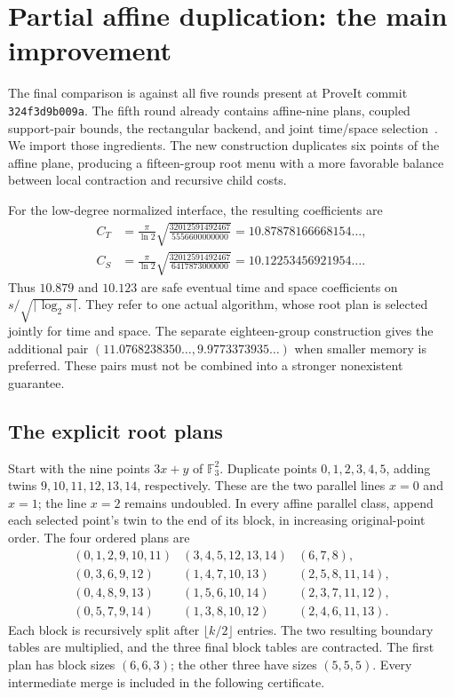 \section{Partial affine duplication: the main improvement}
\label{sec:partial15}

The final comparison is against all five rounds present at ProveIt commit
\texttt{324f3d9b009a}. The fifth round already
contains affine-nine plans, coupled support-pair bounds, the rectangular
backend, and joint time/space selection~\cite{pairwise,affinejoint,affinegeometry,affinecauchy,affineplane}. We import those ingredients.
The new construction duplicates six points of the affine plane, producing
a fifteen-group root menu with a more favorable balance between local
contraction and recursive child costs.

For the low-degree normalized interface, the resulting coefficients are
\begin{align*}
 C_T&=\frac\pi{\ln2}
 \sqrt{\frac{32012591492467}{5556600000000}}
 =10.87878166668154\ldots,\\
 C_S&=\frac\pi{\ln2}
 \sqrt{\frac{32012591492467}{6417873000000}}
 =10.12253456921954\ldots.
\end{align*}
Thus $10.879$ and $10.123$ are safe eventual time and space coefficients
on $s/\sqrt{\lceil\log_2s\rceil}$. They refer to one actual algorithm,
whose root plan is selected jointly for time and space. The separate
eighteen-group construction gives the additional pair
$(11.0768238350\ldots,9.9773373935\ldots)$ when smaller memory is preferred.
These pairs must not be combined into a stronger nonexistent guarantee.

\subsection{The explicit root plans}

Start with the nine points $3x+y$ of $\mathbb F_3^2$. Duplicate points
$0,1,2,3,4,5$, adding twins $9,10,11,12,13,14$, respectively. These are
the two parallel lines $x=0$ and $x=1$; the line $x=2$ remains undoubled.
In every affine parallel class, append each selected point's twin to the
end of its block, in increasing original-point order. The four ordered
plans are
\[
\begin{array}{lll}
(0,1,2,9,10,11)&(3,4,5,12,13,14)&(6,7,8),\\
(0,3,6,9,12)&(1,4,7,10,13)&(2,5,8,11,14),\\
(0,4,8,9,13)&(1,5,6,10,14)&(2,3,7,11,12),\\
(0,5,7,9,14)&(1,3,8,10,12)&(2,4,6,11,13).
\end{array}
\]
Each block is recursively split after $\lfloor k/2\rfloor$ entries.
The two resulting boundary tables are multiplied, and the three final
block tables are contracted. The first plan has block sizes $(6,6,3)$;
the other three have sizes $(5,5,5)$. Every intermediate merge is included
in the following certificate.

